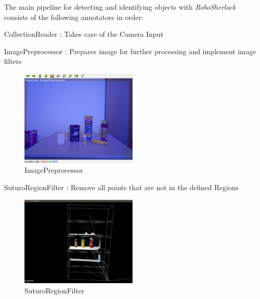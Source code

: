 \documentclass[main.tex]{subfiles}
\begin{document}
The main pipeline for detecting and identifying objects with \textit{RoboSherlock} consists of the following annotators in order:  
\begin{itemize}
    \item CollectionReader : Takes care of the Camera  Input

    \begin{minipage}[t]{\textwidth}
    \item ImagePreprocessor : Prepares image for further processing and implement image filters
        \begin{figure}[H]
                \centering
                \includegraphics[width=0.5\textwidth]{pictures/2d/ImagePreProcessor.png}
                \caption{ImagePreprocessor}
          \end{figure}
    \end{minipage}

    \begin{minipage}[t]{\textwidth}
    \item SuturoRegionFilter : Remove all points that are not in the defined Regions 
        \begin{figure}[H]
                \centering
                \includegraphics[width=0.5\textwidth]{pictures/pcl/RegionFilter.png}
                \caption{SuturoRegionFilter}
          \end{figure}
    \end{minipage}


\end{itemize}
\end{document}

